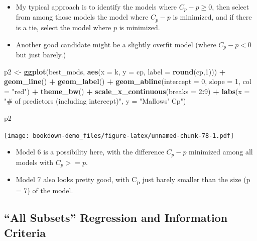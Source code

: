 \documentclass[]{book}
\newenvironment{Shaded}{\begin{snugshade}}{\end{snugshade}}
\newcommand{\KeywordTok}[1]{\textcolor[rgb]{0.13,0.29,0.53}{\textbf{#1}}}
\newcommand{\DataTypeTok}[1]{\textcolor[rgb]{0.13,0.29,0.53}{#1}}
\newcommand{\DecValTok}[1]{\textcolor[rgb]{0.00,0.00,0.81}{#1}}
\newcommand{\StringTok}[1]{\textcolor[rgb]{0.31,0.60,0.02}{#1}}
\newcommand{\OperatorTok}[1]{\textcolor[rgb]{0.81,0.36,0.00}{\textbf{#1}}}
\newcommand{\NormalTok}[1]{#1}
\providecommand{\tightlist}{%
  \setlength{\itemsep}{0pt}\setlength{\parskip}{0pt}}
\theoremstyle{definition}
\theoremstyle{definition}
\theoremstyle{definition}
\theoremstyle{remark}
\begin{document}
\begin{itemize}
\tightlist
\item
  My typical approach is to identify the models where
  \(C_p - p \geq 0\), then select from among those models the model
  where \(C_p - p\) is minimized, and if there is a tie, select the
  model where \(p\) is minimized.
\item
  Another good candidate might be a slightly overfit model (where
  \(C_p - p < 0\) but just barely.)
\end{itemize}

\begin{Shaded}
\begin{Highlighting}[]
\NormalTok{p2 <-}\StringTok{ }\KeywordTok{ggplot}\NormalTok{(best_mods, }\KeywordTok{aes}\NormalTok{(}\DataTypeTok{x =}\NormalTok{ k, }\DataTypeTok{y =}\NormalTok{ cp,}
                            \DataTypeTok{label =} \KeywordTok{round}\NormalTok{(cp,}\DecValTok{1}\NormalTok{))) }\OperatorTok{+}
\StringTok{    }\KeywordTok{geom_line}\NormalTok{() }\OperatorTok{+}
\StringTok{    }\KeywordTok{geom_label}\NormalTok{() }\OperatorTok{+}
\StringTok{    }\KeywordTok{geom_abline}\NormalTok{(}\DataTypeTok{intercept =} \DecValTok{0}\NormalTok{, }\DataTypeTok{slope =} \DecValTok{1}\NormalTok{,}
                \DataTypeTok{col =} \StringTok{"red"}\NormalTok{) }\OperatorTok{+}
\StringTok{    }\KeywordTok{theme_bw}\NormalTok{() }\OperatorTok{+}
\StringTok{    }\KeywordTok{scale_x_continuous}\NormalTok{(}\DataTypeTok{breaks =} \DecValTok{2}\OperatorTok{:}\DecValTok{9}\NormalTok{) }\OperatorTok{+}
\StringTok{    }\KeywordTok{labs}\NormalTok{(}\DataTypeTok{x =} \StringTok{"# of predictors (including intercept)"}\NormalTok{,}
         \DataTypeTok{y =} \StringTok{"Mallows' Cp"}\NormalTok{)}

\NormalTok{p2}
\end{Highlighting}
\end{Shaded}

\texttt{[image: bookdown-demo\_files/figure-latex/unnamed-chunk-78-1.pdf]}

\begin{itemize}
\tightlist
\item
  Model 6 is a possibility here, with the difference \(C_p - p\)
  minimized among all models with \(C_p >= p\).
\item
  Model 7 also looks pretty good, with C\textsubscript{p} just barely
  smaller than the size (p = 7) of the model.
\end{itemize}

\subsection{\texorpdfstring{``All Subsets'' Regression and Information
Criteria}{All Subsets Regression and Information Criteria}}\label{all-subsets-regression-and-information-criteria}
\end{document}
